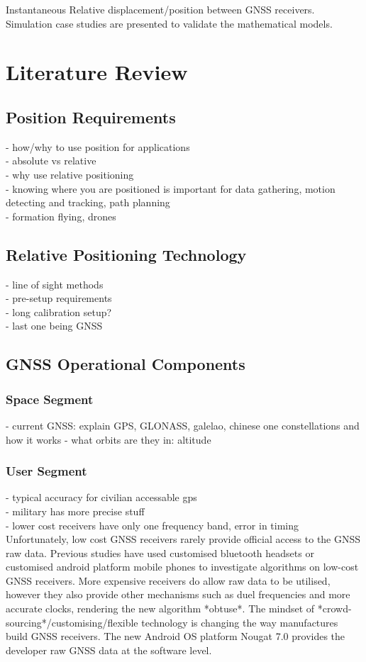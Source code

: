 \documentclass[11pt,a4paper]{article}
\begin{document}
Instantaneous Relative displacement/position between GNSS receivers.
Simulation case studies are presented to validate the mathematical models.


\section{Literature Review}

\subsection{Position Requirements}
- how/why to use position for applications\\
- absolute vs relative\\
- why use relative positioning\\
- knowing where you are positioned is important for data gathering, motion detecting and tracking, path planning\\
- formation flying, drones\\
\subsection{Relative Positioning Technology}
- line of sight methods\\
- pre-setup requirements\\
- long calibration setup?\\


- last one being GNSS
\subsection{GNSS Operational Components}
\subsubsection{Space Segment}
- current GNSS: explain GPS, GLONASS, galelao, chinese one constellations and how it works
- what orbits are they in: altitude
\subsubsection{User Segment}
- typical accuracy for civilian accessable gps\\
- military has more precise stuff\\
- lower cost receivers have only one frequency band, error in timing\\
Unfortunately, low cost GNSS receivers rarely provide official access to the GNSS raw data. Previous studies have used customised bluetooth headsets or customised android platform mobile phones to investigate algorithms on low-cost GNSS receivers. More expensive receivers do allow raw data to be utilised, however they also provide other mechanisms such as duel frequencies and more accurate clocks, rendering the new algorithm *obtuse*. The mindset of *crowd-sourcing*/customising/flexible technology is changing the way manufactures build GNSS receivers. The new Android OS platform Nougat 7.0 provides the developer raw GNSS data at the software level.  
\end{document}

